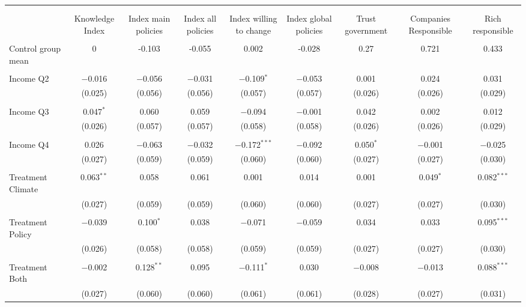 
\begin{tabular}{@{\extracolsep{5pt}}lcccccccc} 
\\[-1.8ex]\hline 
\hline \\[-1.8ex] 
\\[-1.8ex] & Knowledge Index & Index main policies & Index all policies & Index willing to change & Index global policies & Trust government & Companies Responsible & Rich responsible \\ 
\hline \\[-1.8ex] 
 Control group mean & 0 & -0.103 & -0.055 & 0.002 & -0.028 & 0.27 & 0.721 & 0.433  \\ \hline \\[-1.8ex] Income Q2 & $-$0.016 & $-$0.056 & $-$0.031 & $-$0.109$^{*}$ & $-$0.053 & 0.001 & 0.024 & 0.031 \\ 
  & (0.025) & (0.056) & (0.056) & (0.057) & (0.057) & (0.026) & (0.026) & (0.029) \\ 
  & & & & & & & & \\ 
 Income Q3 & 0.047$^{*}$ & 0.060 & 0.059 & $-$0.094 & $-$0.001 & 0.042 & 0.002 & 0.012 \\ 
  & (0.026) & (0.057) & (0.057) & (0.058) & (0.058) & (0.026) & (0.026) & (0.029) \\ 
  & & & & & & & & \\ 
 Income Q4 & 0.026 & $-$0.063 & $-$0.032 & $-$0.172$^{***}$ & $-$0.092 & 0.050$^{*}$ & $-$0.001 & $-$0.025 \\ 
  & (0.027) & (0.059) & (0.059) & (0.060) & (0.060) & (0.027) & (0.027) & (0.030) \\ 
  & & & & & & & & \\ 
 Treatment Climate & 0.063$^{**}$ & 0.058 & 0.061 & 0.001 & 0.014 & 0.001 & 0.049$^{*}$ & 0.082$^{***}$ \\ 
  & (0.027) & (0.059) & (0.059) & (0.060) & (0.060) & (0.027) & (0.027) & (0.030) \\ 
  & & & & & & & & \\ 
 Treatment Policy & $-$0.039 & 0.100$^{*}$ & 0.038 & $-$0.071 & $-$0.059 & 0.034 & 0.033 & 0.095$^{***}$ \\ 
  & (0.026) & (0.058) & (0.058) & (0.059) & (0.059) & (0.027) & (0.027) & (0.030) \\ 
  & & & & & & & & \\ 
 Treatment Both & $-$0.002 & 0.128$^{**}$ & 0.095 & $-$0.111$^{*}$ & 0.030 & $-$0.008 & $-$0.013 & 0.088$^{***}$ \\ 
  & (0.027) & (0.060) & (0.060) & (0.061) & (0.061) & (0.028) & (0.027) & (0.031) \\ 

\end{tabular}
